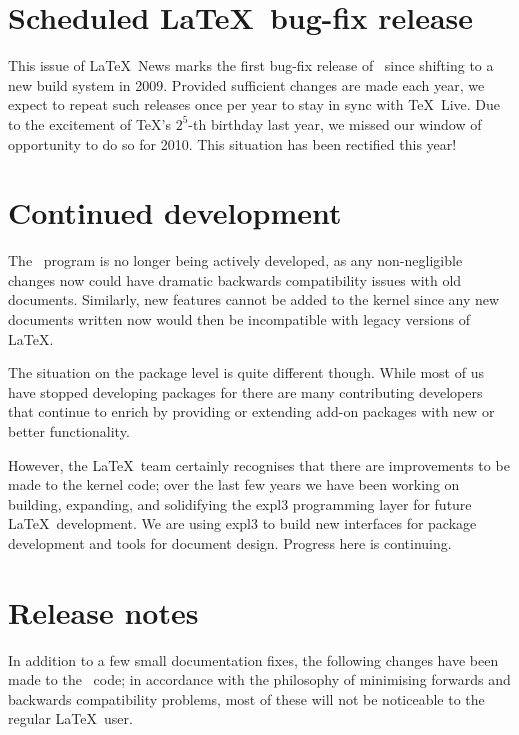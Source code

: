 \documentclass{ltnews}
\begin{document}
\maketitle

\section{Scheduled \LaTeX\ bug-fix release}

This issue of \LaTeX~News marks the first bug-fix release of
\LaTeXe\ since shifting to a new build system in 2009.
Provided sufficient changes are made each year, we expect to
repeat such releases once per year to stay in sync with \TeX\ Live.
Due to the excitement of \TeX's $2^5$-th birthday last year,
we missed our window of opportunity to do so for 2010.
This situation has been rectified this year!

\section{Continued development}

The \LaTeXe\ program is no longer being actively developed, as any
non-negligible changes now could have dramatic backwards compatibility
issues with old documents. Similarly, new features cannot be added to
the kernel since any new documents written now would then be
incompatible with legacy versions of \LaTeX.

The situation on the package level is quite different though. While
most of us have stopped developing packages for \LaTeXe{} there are
many contributing developers that continue to enrich \LaTeXe{} by
providing or extending add-on packages with new or better
functionality.

However, the \LaTeX\ team certainly recognises that there are
improvements to be made to the kernel code; over the last few years we
have been working on building, expanding, and solidifying the
\textsf{expl3} programming layer for future \LaTeX\ development. We
are using \textsf{expl3} to build new interfaces for package
development and tools for document design. Progress here is
continuing.

\section{Release notes}

In addition to a few small documentation fixes, the following changes
have been made to the \LaTeXe\ code; in accordance with the philosophy
of minimising forwards and backwards compatibility problems, most of
these will not be noticeable to the regular \LaTeX\ user.
\end{document}
